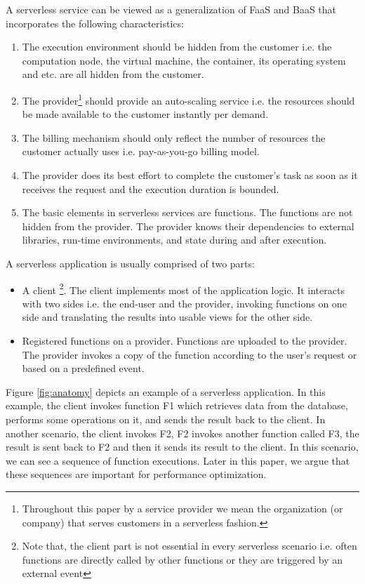 A serverless service can be viewed as a generalization of FaaS and BaaS that incorporates the following characteristics: 
\begin{enumerate}
\item The execution environment should be hidden from the customer i.e. the computation node, the virtual machine, the container, its operating system and etc. are all hidden from the customer.
\item The provider\footnote{Throughout this paper by a service provider we mean the organization (or company) that serves customers in a serverless fashion.} should provide an auto-scaling service i.e. the resources should be made available to the customer instantly per demand.
\item The billing mechanism should only reflect the number of resources the customer actually uses i.e. pay-as-you-go billing model.
\item The provider does its best effort to complete the customer's task as soon as it receives the request and the execution duration is bounded.
\item The basic elements in serverless services are functions. The functions are not hidden from the provider. The provider knows their dependencies to external libraries, run-time environments, and state during and after execution.
\end{enumerate}
A serverless application is usually comprised of two parts:
\begin{itemize}
\item A client \footnote{Note that, the client part is not essential in every serverless scenario i.e. often functions are directly called by other functions or they are triggered by an external event}. The client implements most of the application logic. It interacts with two sides i.e. the end-user and the provider, invoking functions on one side and translating the results into usable views for the other side.
\item Registered functions on a provider. Functions are uploaded to the provider. The provider invokes a copy of the function according to the user's request or based on a predefined event.
\end{itemize}
Figure \ref{fig:anatomy} depicts an example of a serverless application. In this example, the client invokes function F1 which retrieves data from the database, performs some operations on it, and sends the result back to the client. In another scenario, the client invokes F2, F2 invokes another function called F3, the result is sent back to F2 and then it sends its result to the client. In this scenario, we can see a sequence of function executions. Later in this paper, we argue that these sequences are important for performance optimization.
